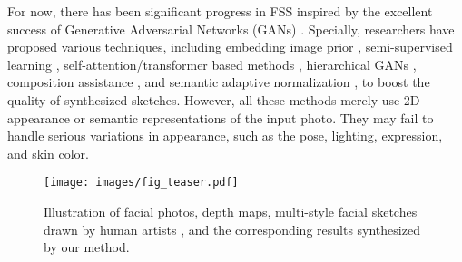\documentclass[10pt,twocolumn,letterpaper]{article}
\begin{document}
For now, there has been significant progress in FSS inspired by the excellent success of Generative Adversarial Networks (GANs) \cite{Isola2017Pix2Pix}. 
Specially, researchers have proposed various techniques, including embedding image prior \cite{Zhang2018IJCAI}, semi-supervised learning \cite{Chen2018Semi}, self-attention/transformer based methods \cite{gao2020incremental, zhu2021sketch,duan2020multi}, hierarchical GANs \cite{Peng2019DeepPGM, Zhang2019TIP, Fan2021FS2K}, composition assistance \cite{gao2020cagan}, and semantic adaptive normalization \cite{li2021genre}, to boost the quality of synthesized sketches. 
However, all these methods merely use 2D appearance or semantic representations of the input photo. 
They may fail to handle serious variations in appearance, such as the pose, lighting, expression, and skin color. %


\begin{figure}
  \texttt{[image: images/fig\_teaser.pdf]}
  \caption{Illustration of facial photos, depth maps, multi-style facial sketches drawn by human artists \cite{Fan2021FS2K}, and the corresponding results synthesized by our method.}
  \label{fig:teaser}
\end{figure}


\end{document}
